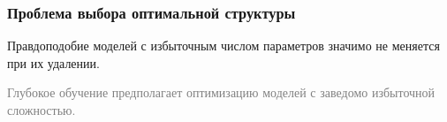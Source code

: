 \documentclass[usenames,dvipsnames,11pt,pdf,utf8,russian,aspectratio=43]{beamer}
\begin{document}
\begin{frame}    
                                                                                                                        
\frametitle{Проблема выбора оптимальной структуры }                                                                                                          
Правдоподобие моделей с избыточным числом параметров значимо не меняется при их удалении.                                                       
\begin{figure}[h]                                                                                                                               
\centering                                                                                                                                      
\hspace*{-1cm}                                       
\end{figure}                                                                                                   
\textcolor{gray}{Глубокое обучение предполагает оптимизацию моделей с заведомо избыточной сложностью.}  

                                                                                                                                             
\end{frame}    
\end{document}
